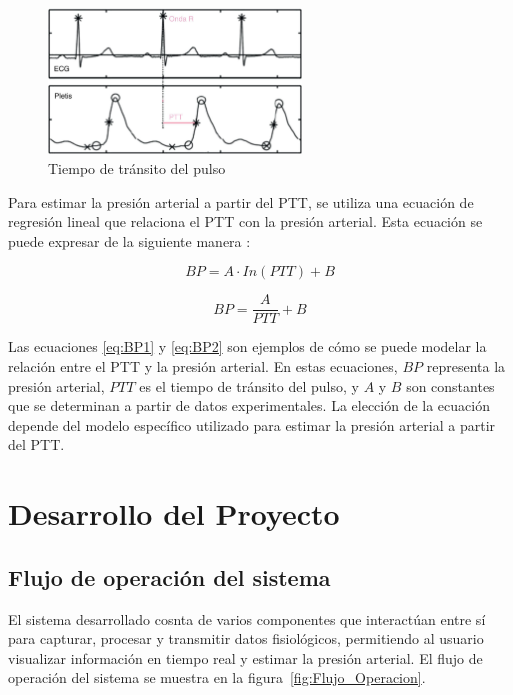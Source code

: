     \begin{figure}[H]
        \centering
        \includegraphics[width=0.6\textwidth]{img/Marco/ptt.jpeg}
        \caption[Tiempo de tránsito del pulso.]{Tiempo de tránsito del pulso\footnotemark}
        \label{fig:ptt}
    \end{figure}

    Para estimar la presión arterial a partir del PTT, se utiliza una ecuación de regresión lineal que relaciona el PTT con la presión arterial. Esta ecuación se puede expresar de la siguiente manera \cite{Gao_2016}:

    \begin{equation}
        \label{eq:BP1}
        BP = A \cdot In(PTT) + B
    \end{equation}

    \begin{equation}
        \label{eq:BP2}
        BP = \frac{A}{PTT} + B
    \end{equation}

    Las ecuaciones \ref{eq:BP1} y \ref{eq:BP2} son ejemplos de cómo se puede modelar la relación entre el PTT y la presión arterial. En estas ecuaciones, $BP$ representa la presión arterial, $PTT$ es el tiempo de tránsito del pulso, y $A$ y $B$ son constantes que se determinan a partir de datos experimentales. La elección de la ecuación depende del modelo específico utilizado para estimar la presión arterial a partir del PTT.



\newpage
\section{Desarrollo del Proyecto}
    \subsection{Flujo de operación del sistema}
    El sistema desarrollado cosnta de varios componentes que interactúan entre sí para capturar, procesar y transmitir datos fisiológicos, permitiendo al usuario visualizar información en tiempo real y estimar la presión arterial. El flujo de operación del sistema se muestra en la figura~\ref{fig:Flujo_Operacion}.

